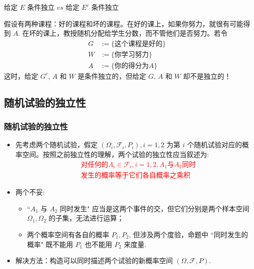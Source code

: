 \begin{frame}{给定 $E$ 条件独立 $vs$ 给定 $E^c$ 条件独立}
\begin{exam}
\label{27}
假设有两种课程：好的课程和坏的课程。在好的课上，如果你努力，就很有可能得到 $A$. 在坏的课上，教授随机分配给学生分数，而不管他们是否努力。若令
\begin{align*}
	G&:= \{\mbox{这个课程是好的}\}\\
	W&:= \{\mbox{你学习努力}\}\\
	A&:=\{\mbox{你的得分为} A\}
 \end{align*}
 \pause 这时，给定 $G^c$, $A$ 和 $W$ 是条件独立的，但给定 $G$, $A$ 和 $W$ 却不是独立的！

\end{exam}
\end{frame}

\subsection{随机试验的独立性}
 \begin{frame}
              \frametitle{随机试验的独立性}

               \begin{itemize}[<+-|alert@+>]
               \item 先考虑两个随机试验，假定 $(\Omega_i,\mathcal{F}_i,P_i), i=1,2$ 为第 $i$ 个随机试验对应的概率空间。按照之前独立性的理解，两个试验的独立性应当叙述为:\pause
                \textcolor{red}{ \begin{eqnarray*}
                   &&\mbox{对任何的} A_i\in\mathcal{F}_i, i=1,2, A_1\mbox{与} A_2\mbox{同时}\\
                   &&\mbox{发生的概率等于它们各自概率之乘积}
                 \end{eqnarray*}}
             \item 两个不妥:
               \begin{itemize}[<+-|alert@+>]
               \item ``$A_1$ 与 $A_2$ 同时发生" 应当是这两个事件的交，但它们分别是两个样本空间 $\Omega_1,\Omega_2$ 的子集，无法进行运算；
               \item 两个概率空间有各自的概率 $P_1, P_2$, 但涉及两个度验，命题中 ``同时发生的概率" 既不能用 $P_1$ 也不能用 $P_2$ 来度量.
               \end{itemize}
             \item 解决方法：构造可以同时描述两个试验的新概率空间 $(\Omega,\mathcal{F},P)$.
               \end{itemize}
             \end{frame}


